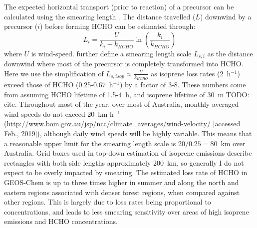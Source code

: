      
      The expected horizontal transport (prior to reaction) of a precursor can be calculated using the smearing length \parencite{Palmer2003}.
      The distance travelled ($L$) downwind by a precursor ($i$) before forming HCHO can be estimated through:
      \begin{equation*}
        L_{i} = \frac{U}{k_i - k_{HCHO}} \ln{ \left( \frac{k_i}{k_{HCHO}} \right) }
      \end{equation*}
      where $U$ is wind-speed.
      \textcite{Palmer2003} further define a smearing length scale $L_{s,i}$ as the distance downwind where most of the precursor is completely transformed into HCHO.
      Here we use the simplification of $L_{s,isop} \approx \frac{U}{k_{HCHO}}$ as isoprene loss rates (2~h$^{-1}$) exceed those of HCHO (0.25-0.67~h$^{-1}$) by a factor of 3-8.
      These numbers come from assuming HCHO lifetime of 1.5-4~h, and isoprene lifetime of 30~m TODO: cite.
      Throughout most of the year, over most of Australia, monthly averaged wind speeds do not exceed 20~km h$^{-1}$ (\url{http://www.bom.gov.au/jsp/ncc/climate_averages/wind-velocity/} [accessed Feb., 2019]), although daily wind speeds will be highly variable.
      This means that a reasonable upper limit for the smearing length scale is $20 / 0.25 = 80$~km over Australia.
      Grid boxes used in top-down estimation of isoprene emissions describe rectangles with both side lengths approximately 200~km, so generally I do not expect to be overly impacted by smearing.
      The estimated loss rate of HCHO in GEOS-Chem %
      is up to three times higher in summer and along the north and eastern regions associated with denser forest regions, when compared against other regions.
      This is largely due to loss rates being proportional to concentrations, and leads to less smearing sensitivity over areas of high isoprene emissions and HCHO concentrations.
       
      
